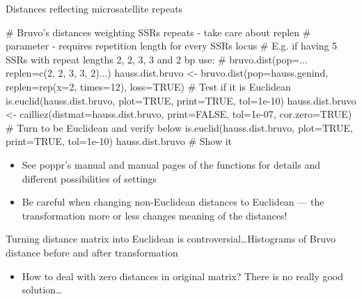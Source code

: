 \documentclass[compress, xelatex, 11pt, xcolor=svgnames, aspectratio=169,
	hyperref={
		bookmarks=true,
		unicode=true,
		colorlinks=true,
		pdftitle={Molecular data in R},
		plainpages=false,
		pdfauthor={Vojtech Zeisek},
		pdfsubject={Course about phylogeny and evolution in R},
		pdfcreator={XeLaTeX},
		pdfkeywords={R, evolution, phylogeny, molecular data},
		linkcolor=Crimson, %
		anchorcolor=Magenta, %
		citecolor=Magenta, %
		filecolor=Magenta, %
		menucolor=Magenta, %
		urlcolor=DodgerBlue, %
		},
	url={hyphens, lowtilde} %
	]{beamer}
\renewcommand{\texttt}[1]{\colorbox{Beige}{{\ttfamily #1}}}
\begin{document}
\begin{frame}[fragile]{Distances reflecting microsatellite repeats}
	\begin{spluscode}
    # Bruvo's distances weighting SSRs repeats - take care about replen
    # parameter - requires repetition length for every SSRs locus
    # E.g. if having 5 SSRs with repeat lengths 2, 2, 3, 3 and 2 bp use:
    # bruvo.dist(pop=... replen=c(2, 2, 3, 3, 2)...)
    hauss.dist.bruvo <- bruvo.dist(pop=hauss.genind, replen=rep(x=2, times=12),
      loss=TRUE)
    # Test if it is Euclidean
    is.euclid(hauss.dist.bruvo, plot=TRUE, print=TRUE, tol=1e-10)
    hauss.dist.bruvo <- cailliez(distmat=hauss.dist.bruvo, print=FALSE,
      tol=1e-07, cor.zero=TRUE) # Turn to be Euclidean and verify below
    is.euclid(hauss.dist.bruvo, plot=TRUE, print=TRUE, tol=1e-10)
    hauss.dist.bruvo  # Show it
	\end{spluscode}
	\begin{itemize}
		\item See poppr's manual and manual pages of the functions for details and different possibilities of settings
		\item Be careful when changing non-Euclidean distances to Euclidean --- \alert{the transformation more or less changes meaning of the distances!}
	\end{itemize}
\end{frame}

\begin{frame}{Turning distance matrix into Euclidean is controversial\ldots}{Histograms of Bruvo distance before and after transformation}
	\begin{itemize}
		\item How to deal with zero distances in original matrix? There is no really good solution\ldots
	\end{itemize}
	\begin{center}
		\texttt{[image: bruvodist.png]}
	\end{center}
\end{frame}
\end{document}
